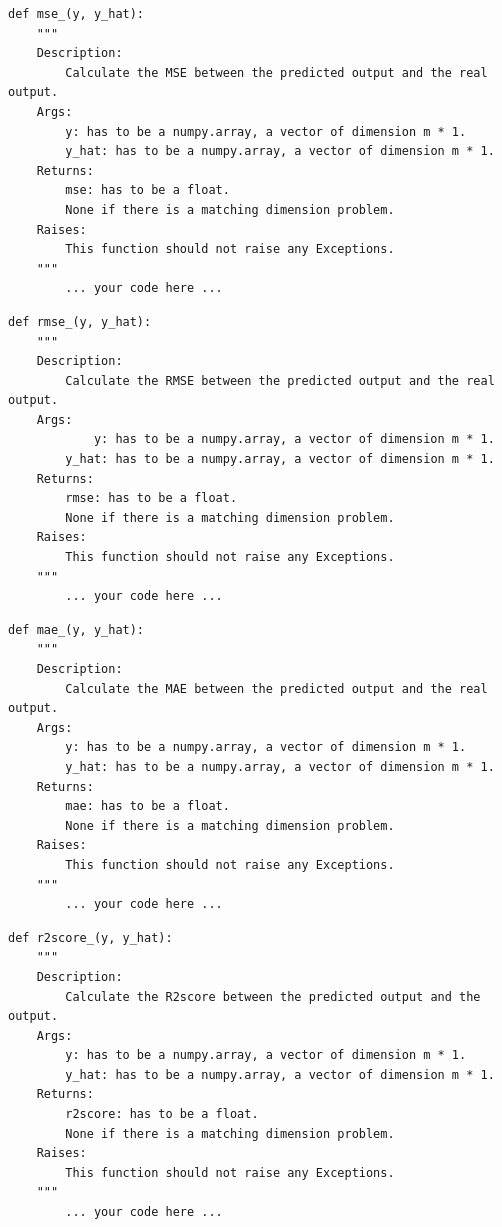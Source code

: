 \documentclass{42-en}
\begin{document}
\begin{verbatim}
def mse_(y, y_hat):
	"""
	Description:
		Calculate the MSE between the predicted output and the real output.
	Args:
        y: has to be a numpy.array, a vector of dimension m * 1.
        y_hat: has to be a numpy.array, a vector of dimension m * 1.		
	Returns:
		mse: has to be a float.
		None if there is a matching dimension problem.
	Raises:
		This function should not raise any Exceptions.
	"""
		... your code here ...
\end{verbatim}
\begin{verbatim}
def rmse_(y, y_hat):
	"""
	Description:
		Calculate the RMSE between the predicted output and the real output.
	Args:
	        y: has to be a numpy.array, a vector of dimension m * 1.
        y_hat: has to be a numpy.array, a vector of dimension m * 1.		
	Returns:
		rmse: has to be a float.
		None if there is a matching dimension problem.
	Raises:
		This function should not raise any Exceptions.
	"""
		... your code here ...
\end{verbatim}
\begin{verbatim}
def mae_(y, y_hat):
	"""
	Description:
		Calculate the MAE between the predicted output and the real output.
	Args:
        y: has to be a numpy.array, a vector of dimension m * 1.
        y_hat: has to be a numpy.array, a vector of dimension m * 1.		
	Returns:
		mae: has to be a float.
		None if there is a matching dimension problem.
	Raises:
		This function should not raise any Exceptions.
	"""
		... your code here ...
\end{verbatim}
\begin{verbatim}
def r2score_(y, y_hat):
	"""
	Description:
		Calculate the R2score between the predicted output and the output.
	Args:
        y: has to be a numpy.array, a vector of dimension m * 1.
        y_hat: has to be a numpy.array, a vector of dimension m * 1.		
	Returns:
		r2score: has to be a float.
		None if there is a matching dimension problem.
	Raises:
		This function should not raise any Exceptions.
	"""
		... your code here ...
\end{verbatim}

\end{document}
